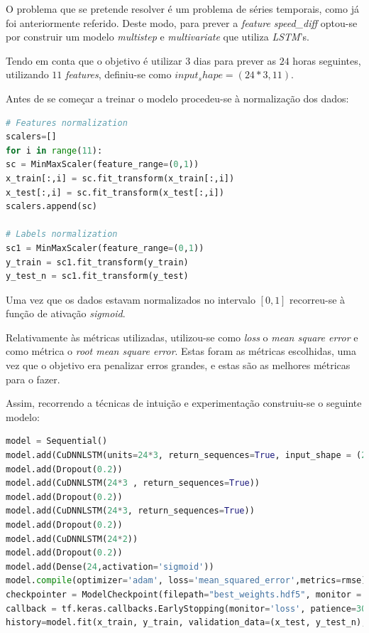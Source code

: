\documentclass[a4paper, 12pt]{article}
\begin{document}
O problema que se pretende resolver é um problema de séries temporais, como já foi anteriormente referido. Deste modo, para prever a \textit{feature speed\_diff} optou-se por construir um modelo \textit{multistep} e \textit{multivariate} que utiliza \textit{LSTM}'s.

Tendo em conta que o objetivo é utilizar $3$ dias para prever as $24$ horas seguintes, utilizando $11$ \textit{features}, definiu-se como $input_shape = (24*3,11)$.

Antes de se começar a treinar o modelo procedeu-se à normalização dos dados:

\begin{lstlisting}[language=Python]
# Features normalization
scalers=[]
for i in range(11):
sc = MinMaxScaler(feature_range=(0,1))
x_train[:,i] = sc.fit_transform(x_train[:,i])
x_test[:,i] = sc.fit_transform(x_test[:,i])
scalers.append(sc)

# Labels normalization
sc1 = MinMaxScaler(feature_range=(0,1))
y_train = sc1.fit_transform(y_train)
y_test_n = sc1.fit_transform(y_test)
\end{lstlisting}

Uma vez que os dados estavam normalizados no intervalo $[0,1]$ recorreu-se à função de ativação \textit{sigmoid}.

Relativamente às métricas utilizadas, utilizou-se como \textit{loss} o \textit{mean square error} e como métrica o \textit{root mean square error}. Estas foram as métricas escolhidas, uma vez que o  objetivo era penalizar erros grandes, e estas são as melhores métricas para o fazer.

Assim, recorrendo a técnicas de intuição e experimentação construiu-se o seguinte modelo:

\begin{lstlisting}[language=Python]
model = Sequential()
model.add(CuDNNLSTM(units=24*3, return_sequences=True, input_shape = (24*3,11) ) )
model.add(Dropout(0.2))
model.add(CuDNNLSTM(24*3 , return_sequences=True))
model.add(Dropout(0.2))
model.add(CuDNNLSTM(24*3, return_sequences=True))
model.add(Dropout(0.2))
model.add(CuDNNLSTM(24*2))
model.add(Dropout(0.2))
model.add(Dense(24,activation='sigmoid'))
model.compile(optimizer='adam', loss='mean_squared_error',metrics=rmse)
checkpointer = ModelCheckpoint(filepath="best_weights.hdf5", monitor = 'val_loss', verbose=1, save_best_only=True)
callback = tf.keras.callbacks.EarlyStopping(monitor='loss', patience=30)
history=model.fit(x_train, y_train, validation_data=(x_test, y_test_n), epochs=1000, callbacks=[callback, checkpointer])
\end{lstlisting}
\end{document}
